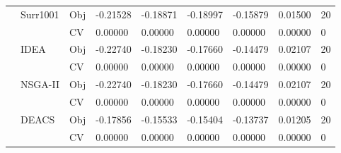 \begin{table*}[!htb]
\begin{tabular}{lllllllll}
		& Surr1001                           & Obj                                & -0.21528                           & -0.18871                           & -0.18997                             & -0.15879                            & 0.01500                           & 20               \\
		&                                    & CV                                 & 0.00000                            & 0.00000                            & 0.00000                              & 0.00000                             & 0.00000                           & 0                \\
		& IDEA                               & Obj                                & -0.22740                           & -0.18230                           & -0.17660                             & -0.14479                            & 0.02107                           & 20               \\
		&                                    & CV                                 & 0.00000                            & 0.00000                            & 0.00000                              & 0.00000                             & 0.00000                           & 0                \\
		& NSGA-II                            & Obj                                & -0.22740                           & -0.18230                           & -0.17660                             & -0.14479                            & 0.02107                           & 20               \\
		&                                    & CV                                 & 0.00000                            & 0.00000                            & 0.00000                              & 0.00000                             & 0.00000                           & 0                \\
		& DEACS                              & Obj                                & -0.17856                           & -0.15533                           & -0.15404                             & -0.13737                            & 0.01205                           & 20               \\
		&                                    & CV                                 & 0.00000                            & 0.00000                            & 0.00000                              & 0.00000                             & 0.00000                           & 0                \\

\end{tabular}
\end{table*}
